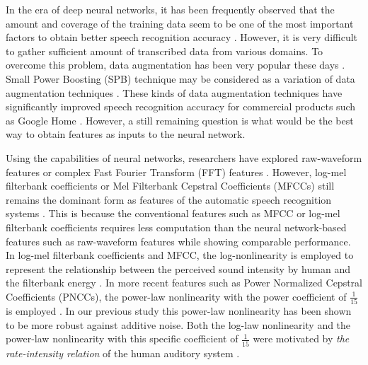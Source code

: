 \documentclass[a4paper]{article}
\begin{document}
In the era of deep neural networks, it has been frequently
observed that the amount and coverage of the training data 
seem to be one of the most important factors to obtain better 
speech recognition accuracy 
\cite{h_soltau_interspeech_2017_00, a_narayanan_slt_2018_00}.
However, it is very difficult to gather sufficient amount of
transcribed data from various domains. To overcome this problem,
data augmentation has been very popular these days 
\cite{w_hartmann_interspeech_2016_00, x_cui_taslp_2015_00, s_park_interspeech_2019_00, c_kim_icassp_2018_00, 
c_kim_interspeech_2019_00}. Small Power Boosting (SPB) technique
may be considered as a variation of data augmentation techniques
\cite{C_Kim_ASRU_2009_2}. These kinds of data augmentation techniques
have significantly improved speech recognition accuracy for commercial
products such as Google Home \cite{
c_kim_interspeech_2017_00, B_Li_INTERSPEECH_2017_1, c_kim_interspeech_2018_00}.
However, a still remaining question is what would be the best way to
obtain features as inputs to the neural network.

Using the capabilities of neural networks,
researchers have explored raw-waveform features
\cite{T_Sainath_IEEETran_2017_1}
or complex Fast Fourier Transform (FFT) features
\cite{c_kim_interspeech_2017_00, B_Li_INTERSPEECH_2017_1}.
However, log-mel filterbank coefficients or Mel Filterbank Cepstral Coefficients 
(MFCCs) \cite{pmermelstein1975} still remains the dominant form as 
features of the automatic speech recognition systems 
\cite{h_hadian_interspeech_2018_00, d_amodei_pmlr_2016_00,
c_kim_icassp_2018_01, c_kim_interspeech_2014_00}. This is because the conventional
features such as MFCC or log-mel filterbank coefficients requires
less computation than the neural network-based features 
such as raw-waveform features \cite{T_Sainath_INTERSPEECH_2015_1} while 
showing comparable performance.  In log-mel filterbank coefficients and MFCC, the
log-nonlinearity is employed to represent the relationship
between the perceived sound intensity by human and
the filterbank energy \cite{C_Kim_PhDThesis_2010}. In more recent
features such as Power Normalized Cepstral Coefficients (PNCCs), 
the power-law nonlinearity with the power coefficient of $\frac{1}{15}$
is employed \cite{C_Kim_IEEETran_2016_1, C_Kim_ICASSP_2012_1}. In our previous study 
\cite{C_Kim_ICASSP_2010_1, C_Kim_INTERSPEECH_2009_2} 
this power-law nonlinearity has been shown 
to be more robust against additive noise. Both the log-law nonlinearity
and the power-law nonlinearity with this specific coefficient of $\frac{1}{15}$
 were 
motivated by {\it the rate-intensity relation} of the human auditory system
\cite{C_Kim_PhDThesis_2010, C_Kim_IEEETran_2016_1}.
\end{document}
